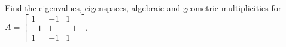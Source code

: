 Find the eigenvalues, eigenspaces, algebraic and geometric multiplicities for 
$A = \begin{bmatrix} 
1 & -1 & 1\\
-1 & 1 & -1\\
1 & -1 & 1
\end{bmatrix}$.